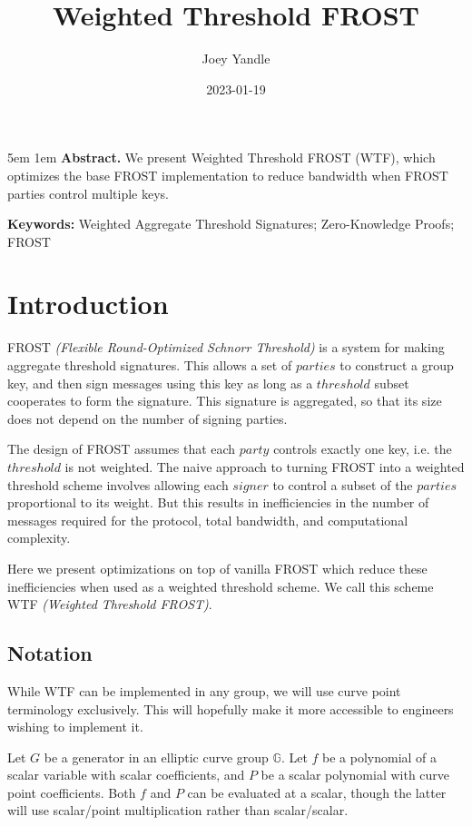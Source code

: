 \documentclass{article}
\title{Weighted Threshold FROST}
\date{2023-01-19}
\author{Joey Yandle}
\begin{document}
\onecolumn
\maketitle

\begingroup
\leftskip5em
\parskip1em
\rightskip\leftskip
\noindent\textbf{Abstract.} We present Weighted Threshold FROST (WTF), which optimizes the base FROST implementation to reduce bandwidth when FROST parties control multiple keys.

\par
\noindent\textbf{Keywords:} Weighted Aggregate Threshold Signatures; Zero-Knowledge Proofs; FROST
\par
\endgroup

\section{
  Introduction
}

FROST \emph{(Flexible Round-Optimized Schnorr Threshold)} \cite{frost} is a system for making aggregate threshold signatures.  This allows a set of $parties$ to construct a group key, and then sign messages using this key as long as a $threshold$ subset cooperates to form the signature.  This signature is aggregated, so that its size does not depend on the number of signing parties.

The design of FROST assumes that each $party$ controls exactly one key, i.e. the $threshold$ is not weighted.  The naive approach to turning FROST into a weighted threshold scheme involves allowing each $signer$ to control a subset of the $parties$ proportional to its weight.  But this results in inefficiencies in the number of messages required for the protocol, total bandwidth, and computational complexity.

Here we present optimizations on top of vanilla FROST which reduce these inefficiencies when used as a weighted threshold scheme.  We call this scheme WTF \emph{(Weighted Threshold FROST)}.

\subsection{
  Notation
}

While WTF can be implemented in any group, we will use curve point terminology exclusively.  This will hopefully make it more accessible to engineers wishing to implement it.

Let $G$ be a generator in an elliptic curve group $\mathbb{G}$.  Let $f$ be a polynomial of a scalar variable with scalar coefficients, and $P$ be a scalar polynomial with curve point coefficients.  Both $f$ and $P$ can be evaluated at a scalar, though the latter will use scalar/point multiplication rather than scalar/scalar.
\end{document}
